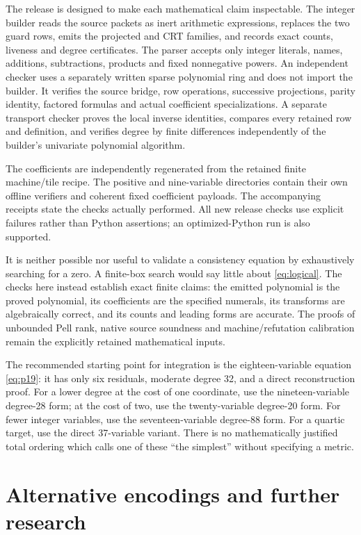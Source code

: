 \documentclass[11pt]{article}
\theoremstyle{remark}\newtheorem{remark}[theorem]{Remark}
\begin{document}
The release is designed to make each mathematical claim inspectable.
The integer builder reads the source packets as inert arithmetic
expressions, replaces the two guard rows, emits the projected and CRT
families, and records exact counts, liveness and degree certificates.
The parser accepts only integer literals, names, additions,
subtractions, products and fixed nonnegative powers. An independent
checker uses a separately written sparse polynomial ring and does not
import the builder. It verifies the source bridge, row operations,
successive projections, parity identity, factored formulas and actual
coefficient specializations. A separate transport checker proves the
local inverse identities, compares every retained row and definition,
and verifies degree by finite differences independently of the builder's
univariate polynomial algorithm.

The coefficients are independently regenerated from the retained finite
machine/tile recipe. The positive and nine-variable directories contain
their own offline verifiers and coherent fixed coefficient payloads.
The accompanying receipts state the checks actually performed. All new
release checks use explicit failures rather than Python assertions;
an optimized-Python run is also supported.

It is neither possible nor useful to validate a consistency equation by
exhaustively searching for a zero. A finite-box search would say little
about \eqref{eq:logical}. The checks here instead establish exact finite
claims: the emitted polynomial is the proved polynomial, its coefficients
are the specified numerals, its transforms are algebraically correct,
and its counts and leading forms are accurate. The proofs of unbounded
Pell rank, native source soundness and machine/refutation calibration
remain the explicitly retained mathematical inputs.

The recommended starting point for integration is the eighteen-variable
equation \eqref{eq:p19}: it has only six residuals, moderate degree 32,
and a direct reconstruction proof. For a lower degree at the cost of
one coordinate, use the nineteen-variable degree-28 form; at the cost
of two, use the twenty-variable degree-20 form. For fewer
integer variables, use the seventeen-variable degree-88 form. For a
quartic target, use the direct 37-variable variant. There is no
mathematically justified total ordering which calls one of these
``the simplest'' without specifying a metric.

\section{Alternative encodings and further research}
\label{sec:alternatives}
\end{document}

